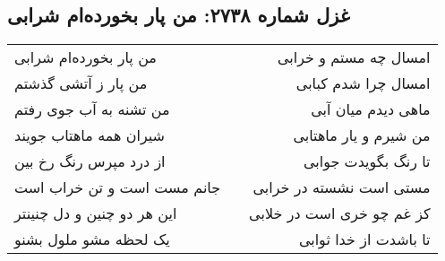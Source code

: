 \begin{center}
\section*{غزل شماره ۲۷۳۸: من پار بخورده‌ام شرابی}
\label{sec:2738}
\begin{longtable}{l p{0.5cm} r}
من پار بخورده‌ام شرابی
&&
امسال چه مستم و خرابی
\\
من پار ز آتشی گذشتم
&&
امسال چرا شدم کبابی
\\
من تشنه به آب جوی رفتم
&&
ماهی دیدم میان آبی
\\
شیران همه ماهتاب جویند
&&
من شیرم و یار ماهتابی
\\
از درد مپرس رنگ رخ بین
&&
تا رنگ بگویدت جوابی
\\
جانم مست است و تن خراب است
&&
مستی است نشسته در خرابی
\\
این هر دو چنین و دل چنینتر
&&
کز غم چو خری است در خلابی
\\
یک لحظه مشو ملول بشنو
&&
تا باشدت از خدا ثوابی
\\
\end{longtable}
\end{center}
